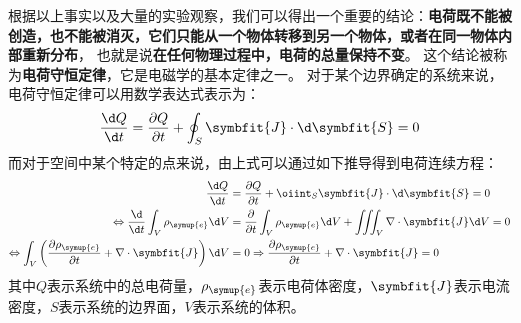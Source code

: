 根据以上事实以及大量的实验观察，我们可以得出一个重要的结论：\textbf{电荷既不能被创造，也不能被消灭，它们只能从一个物体转移到另一个物体，或者在同一物体内部重新分布}，
也就是说\textbf{在任何物理过程中，电荷的总量保持不变}。
这个结论被称为\textbf{电荷守恒定律}，它是电磁学的基本定律之一。
对于某个边界确定的系统来说，电荷守恒定律可以用数学表达式表示为：
\begin{equation}
    \frac{\d Q}{\d t} = \frac{\partial Q}{\partial t} + \oint_S \symbfit{J} \cdot \d \symbfit{S} = 0
\end{equation}
而对于空间中某个特定的点来说，由上式可以通过如下推导得到电荷连续方程：
\begin{equation}
    \begin{aligned}
        \frac{\d Q}{\d t}                                                                                                  & = \frac{\partial Q}{\partial t} + \oiint_S \symbfit{J} \cdot \d \symbfit{S} = 0                         \\
        \Leftrightarrow \frac{\d}{\d t} \int_V \rho_{\symup{e}} \d V                                                       & = \frac{\partial}{\partial t} \int_V \rho_{\symup{e}} \d V + \iiint_V \nabla \cdot \symbfit{J} \d V = 0 \\
        \Leftrightarrow \int_V \left( \frac{\partial \rho_{\symup{e}}}{\partial t} + \nabla \cdot \symbfit{J} \right) \d V & = 0
        \Rightarrow \frac{\partial \rho_{\symup{e}}}{\partial t} + \nabla \cdot \symbfit{J} = 0
    \end{aligned}
\end{equation}
其中$Q$表示系统中的总电荷量，$\rho_{\symup{e}}$表示电荷体密度，$\symbfit{J}$表示电流密度，$S$表示系统的边界面，$V$表示系统的体积。
